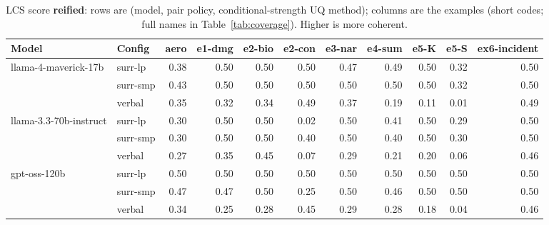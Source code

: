 \documentclass[11pt]{article}
\begin{document}
\begin{table}[htbp]
\centering
\footnotesize
\setlength{\tabcolsep}{3.5pt}
\caption{LCS score \textbf{reified}: rows are (model, pair policy, conditional-strength UQ method); columns are the examples (short codes; full names in Table~\ref{tab:coverage}). Higher is more coherent.}
\label{tab:reified}
\begin{tabular}{llrrrrrrrrr}
\toprule
\textbf{Model} & \textbf{Config} & \textbf{aero} & \textbf{e1-dmg} & \textbf{e2-bio} & \textbf{e2-con} & \textbf{e3-nar} & \textbf{e4-sum} & \textbf{e5-K} & \textbf{e5-S} & \textbf{ex6-incident} \\
\midrule
llama-4-maverick-17b & surr-lp & 0.38 & 0.50 & 0.50 & 0.50 & 0.47 & 0.49 & 0.50 & 0.32 & 0.50 \\
 & surr-smp & 0.43 & 0.50 & 0.50 & 0.50 & 0.50 & 0.50 & 0.50 & 0.32 & 0.50 \\
 & verbal & 0.35 & 0.32 & 0.34 & 0.49 & 0.37 & 0.19 & 0.11 & 0.01 & 0.49 \\
\midrule
llama-3.3-70b-instruct & surr-lp & 0.30 & 0.50 & 0.50 & 0.02 & 0.50 & 0.41 & 0.50 & 0.29 & 0.50 \\
 & surr-smp & 0.30 & 0.50 & 0.50 & 0.40 & 0.50 & 0.40 & 0.50 & 0.30 & 0.50 \\
 & verbal & 0.27 & 0.35 & 0.45 & 0.07 & 0.29 & 0.21 & 0.20 & 0.06 & 0.46 \\
\midrule
gpt-oss-120b & surr-lp & 0.50 & 0.50 & 0.50 & 0.50 & 0.50 & 0.50 & 0.50 & 0.50 & 0.50 \\
 & surr-smp & 0.47 & 0.47 & 0.50 & 0.25 & 0.50 & 0.46 & 0.50 & 0.50 & 0.50 \\
 & verbal & 0.34 & 0.25 & 0.28 & 0.45 & 0.29 & 0.28 & 0.18 & 0.04 & 0.46 \\
\bottomrule
\end{tabular}
\end{table}
\end{document}
